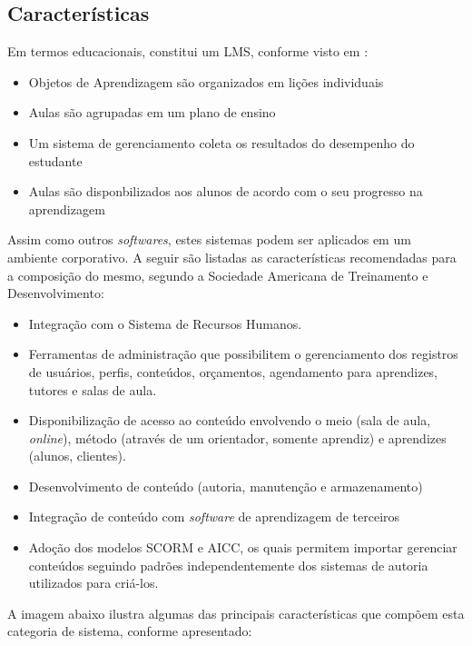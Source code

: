 \documentclass[12pt]{article}
\begin{document}
\subsection{Características}

Em termos educacionais, constitui um LMS, conforme visto em \cite{bailey1992wanted}:

\begin{itemize}
 \setlength\itemsep{0.5em}
 \item Objetos de Aprendizagem são organizados em lições individuais
 \item Aulas são agrupadas em um plano de ensino
 \item Um sistema de gerenciamento coleta os resultados do desempenho do estudante
 \item Aulas são disponbilizados aos alunos de acordo com o seu progresso na aprendizagem
\end{itemize}

Assim como outros \textit{softwares}, estes sistemas podem ser aplicados em um ambiente corporativo. A seguir são listadas as características 
recomendadas para a composição do mesmo, segundo a Sociedade Americana de Treinamento e Desenvolvimento:

\begin{itemize}
 \setlength\itemsep{0.5em}
 \item Integração com o Sistema de Recursos Humanos.
 \item Ferramentas de administração que possibilitem o gerenciamento dos registros de usuários, perfis, conteúdos, orçamentos, agendamento para 
 aprendizes, tutores e salas de aula.
 \item Disponibilização de acesso ao conteúdo envolvendo o meio (sala de aula, \textit{online}), método (através de um orientador, 
 somente aprendiz) e aprendizes (alunos, clientes).
 \item Desenvolvimento de conteúdo (autoria, manutenção e armazenamento)
 \item Integração de conteúdo com \textit{software} de aprendizagem de terceiros
 \item Adoção dos modelos SCORM e AICC, os quais permitem importar gerenciar conteúdos seguindo padrões independentemente dos sistemas de 
 autoria utilizados para criá-los.
\end{itemize}

A imagem abaixo ilustra algumas das principais características que compõem esta categoria de sistema, conforme apresentado:
\end{document}
